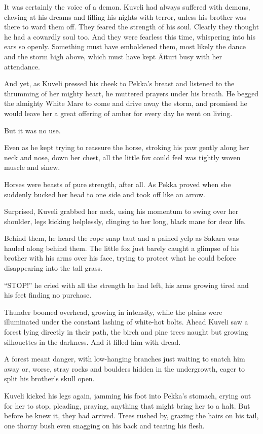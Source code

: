 It was certainly the voice of a demon. Kuveli had always suffered with demons, clawing at his dreams and filling his nights with terror, unless his brother was there to ward them off. They feared the strength of his soul. Clearly they thought he had a cowardly soul too. And they were fearless this time, whispering into his ears so openly. Something must have emboldened them, most likely the dance and the storm high above, which must have kept Äituri busy with her attendance.

And yet, as Kuveli pressed his cheek to Pekka's breast and listened to the thrumming of her mighty heart, he muttered prayers under his breath. He begged the almighty White Mare to come and drive away the storm, and promised he would leave her a great offering of amber for every day he went on living.

But it was no use.

Even as he kept trying to reassure the horse, stroking his paw gently along her neck and nose, down her chest, all the little fox could feel was tightly woven muscle and sinew.

Horses were beasts of pure strength, after all. As Pekka proved when she suddenly bucked her head to one side and took off like an arrow.

Surprised, Kuveli grabbed her neck, using his momentum to swing over her shoulder, legs kicking helplessly, clinging to her long, black mane for dear life.

Behind them, he heard the rope snap taut and a pained yelp as Sakara was hauled along behind them. The little fox just barely caught a glimpse of his brother with his arms over his face, trying to protect what he could before disappearing into the tall grass.

``STOP!'' he cried with all the strength he had left, his arms growing tired and his feet finding no purchase.

Thunder boomed overhead, growing in intensity, while the plains were illuminated under the constant lashing of white-hot bolts. Ahead Kuveli saw a forest lying directly in their path, the birch and pine trees naught but growing silhouettes in the darkness. And it filled him with dread.

A forest meant danger, with low-hanging branches just waiting to snatch him away or, worse, stray rocks and boulders hidden in the undergrowth, eager to split his brother's skull open.

Kuveli kicked his legs again, jamming his foot into Pekka's stomach, crying out for her to stop, pleading, praying, anything that might bring her to a halt. But before he knew it, they had arrived. Trees rushed by, grazing the hairs on his tail, one thorny bush even snagging on his back and tearing his flesh.

